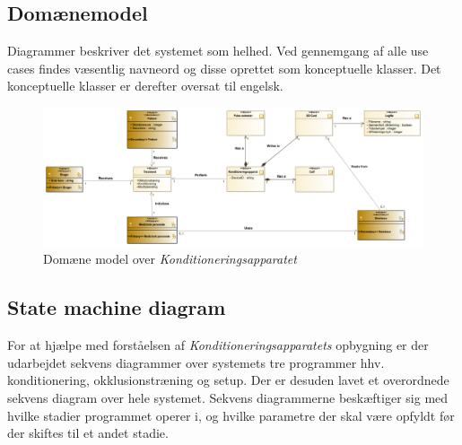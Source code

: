 \subsection{Domænemodel}
Diagrammer beskriver det systemet som helhed. Ved gennemgang af alle use cases findes væsentlig navneord og disse oprettet som konceptuelle klasser. Det konceptuelle klasser er derefter oversat til engelsk. \\
\begin{figure}[H]
	\includegraphics[width=\textwidth]{pdfs/DomainModel.png}
	\caption{Domæne model over \textit{Konditioneringsapparatet}}
\end{figure}


\newpage
\subsection{State machine diagram}
For at hjælpe med forståelsen af \textit{Konditioneringsapparatets} opbygning er der udarbejdet sekvens diagrammer over systemets tre programmer hhv. konditionering, okklusionstræning og setup. Der er desuden lavet et overordnede sekvens diagram over hele systemet. 
Sekvens diagrammerne beskæftiger sig med hvilke stadier programmet operer i, og hvilke parametre der skal være opfyldt før der skiftes til et andet stadie. 
 
